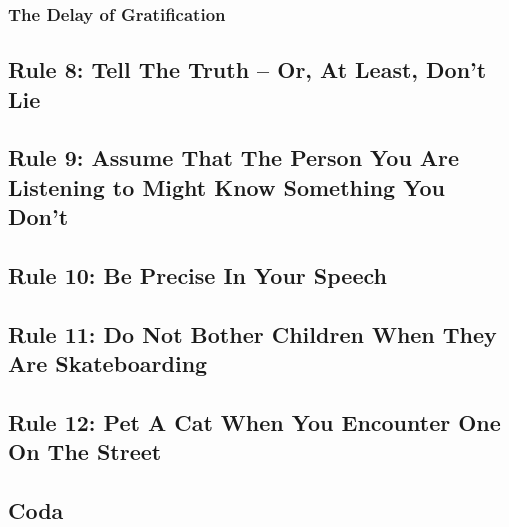\documentclass{article}
\begin{document}
\subsubsection{The Delay of Gratification}


\subsection{Rule 8: Tell The Truth -- Or, At Least, Don't Lie}


\subsection{Rule 9: Assume That The Person You Are Listening to Might Know Something You Don't}


\subsection{Rule 10: Be Precise In Your Speech}


\subsection{Rule 11: Do Not Bother Children When They Are Skateboarding}


\subsection{Rule 12: Pet A Cat When You Encounter One On The Street}


\subsection{Coda}

\end{document}
